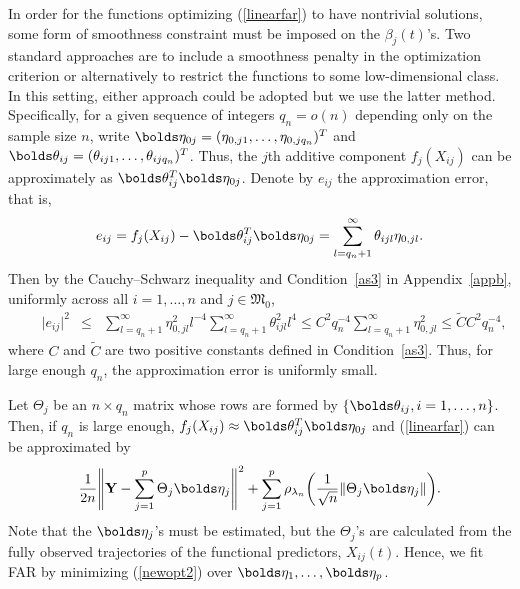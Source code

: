 \documentclass[aos,MSNbibl,dvips]{arximspdf}
\newcommand{\rrvert}{\vert}
\newcommand{\rrVert}{\Vert}
\newcommand{\llvert}{\vert}
\newcommand{\llVert}{\Vert}
\newcommand{\btheta}{\bolds\theta}
\newcommand{\bfeta}{\bolds\eta}
\newcommand{\bY}{{\mathbf Y}}
\newcommand{\bb}{\mathbf{b}}
\newcommand{\Mfrak}{\mathfrak{M}}
\begin{document}
In order for the functions optimizing (\ref{linearfar}) to have
nontrivial solutions, some form of smoothness constraint must be
imposed on
the $\beta_j(t)$'s. Two standard approaches are to include a smoothness
penalty in the optimization criterion or alternatively to restrict the
functions to some low-dimensional class. In this setting, either
approach could be adopted but we use the latter method.
Specifically, for a given sequence of integers $q_n = o(n)$ depending
only on the sample size $n$, write $\bfeta_{0j} = (\eta_{0,j1},\ldots
,\eta_{0,jq_n})^T$ and $\btheta_{ij} = (\theta_{ij1},\ldots, \theta
_{ijq_n})^T$. Thus, the $j$th additive component $f_j(X_{ij})$ can be
approximately as $\btheta_{ij}^T\bfeta_{0j}$. Denote by $e_{ij}$ the
approximation error, that is,
%
\begin{equation}
\label{deferr} e_{ij} = f_j(X_{ij})-
\btheta_{ij}^T\bfeta_{0j} = \sum
_{l=q_n+1}^\infty\theta_{ijl}\eta_{0,jl}.
\end{equation}
%
Then by the Cauchy--Schwarz inequality and Condition~\ref{as3} in
Appendix~\ref{appb}, uniformly across all $i = 1,\ldots, n$ and $j\in
\Mfrak_0$,
%
\begin{eqnarray}
\qquad\llvert e_{ij}\rrvert^2& \leq&\sum
_{l=q_n+1}^\infty\eta_{0,jl}^2l^{-4}
\sum_{l=q_n+1}^\infty\theta_{ijl}^2l^{4}
\leq C^2 q_n^{-4}\sum
_{l=q_n+1}^\infty\eta_{0,jl}^2 \leq
\widetilde C C^2q_n^{-4}, \label{eqapp-err}
\end{eqnarray}
%
where $C$ and $\widetilde C$ are two positive constants defined in
Condition~\ref{as3}. Thus, for large enough $q_n$, the approximation
error is uniformly small.


Let $\Theta_j$ be an
$n\times q_n$ matrix whose rows are formed by $\{\btheta_{ij},
i=1,\ldots, n\}$. Then, if $q_n$ is large enough, $f_j(X_{ij})\approx
\btheta_{ij}^T\bfeta_{0j}$ and (\ref{linearfar}) can be approximated by
%
\begin{equation}
\label{newopt2} \frac{1}{2n}\Biggl\llVert\bY- \sum
_{j=1}^p\Theta_j\bfeta_j
\Biggr\rrVert^2+\sum_{j=1}^p
\rho_{\lambda_n} \biggl(\frac{1}{\sqrt{n}}\llVert\Theta_j
\bfeta_j\rrVert\biggr).
\end{equation}
%
Note that the $\bfeta_j$'s must be estimated, but the
$\Theta_{j}$'s are calculated from the fully observed trajectories of
the functional predictors, $X_{ij}(t)$. Hence, we fit FAR by minimizing
(\ref{newopt2}) over $\bfeta_1,\ldots, \bfeta_p$.
\end{document}
